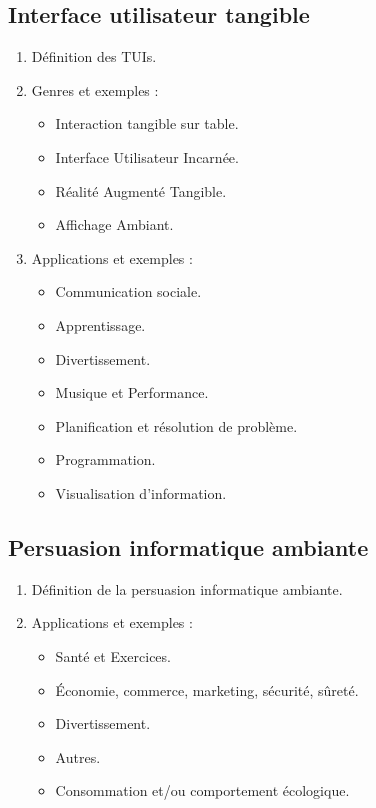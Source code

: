 \documentclass[10pt,a5paper,twoside]{article}
\begin{document}
\subsection{Interface utilisateur
tangible}\label{interface-utilisateur-tangible}

\begin{enumerate}
\def\labelenumi{\arabic{enumi}.}
\itemsep1pt\parskip0pt
\item
  Définition des TUIs.
\item
  Genres et exemples :

  \begin{itemize}
  \itemsep1pt\parskip0pt
  \item
    Interaction tangible sur table.
  \item
    Interface Utilisateur Incarnée.
  \item
    Réalité Augmenté Tangible.
  \item
    Affichage Ambiant.
  \end{itemize}
\item
  Applications et exemples :

  \begin{itemize}
  \itemsep1pt\parskip0pt
  \item
    Communication sociale.
  \item
    Apprentissage.
  \item
    Divertissement.
  \item
    Musique et Performance.
  \item
    Planification et résolution de problème.
  \item
    Programmation.
  \item
    Visualisation d'information.
  \end{itemize}
\end{enumerate}

\subsection{Persuasion informatique
ambiante}\label{persuasion-informatique-ambiante}

\begin{enumerate}
\def\labelenumi{\arabic{enumi}.}
\itemsep1pt\parskip0pt
\item
  Définition de la persuasion informatique ambiante.
\item
  Applications et exemples :

  \begin{itemize}
  \itemsep1pt\parskip0pt
  \item
    Santé et Exercices.
  \item
    Économie, commerce, marketing, sécurité, sûreté.
  \item
    Divertissement.
  \item
    Autres.
  \item
    Consommation et/ou comportement écologique.
  \end{itemize}
\end{enumerate}
\end{document}
